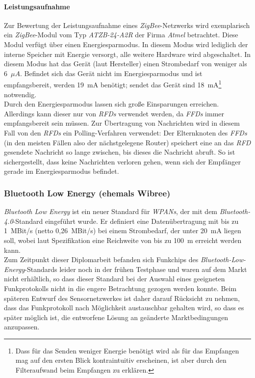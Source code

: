             \paragraph{Leistungsaufnahme}
                Zur Bewertung der Leistungsaufnahme eines \emph{ZigBee}-Netzwerks wird exemplarisch ein 
                \emph{ZigBee}-Modul
                vom Typ \emph{ATZB-24-A2R} der Firma \emph{Atmel} betrachtet. Diese Modul verfügt über einen 
                Energiesparmodus.  In diesem Modus wird lediglich der interne Speicher mit Energie versorgt, alle 
                weitere Hardware wird abgeschaltet. In diesem Modus hat das Gerät (laut Hersteller) einen Strombedarf 
                von weniger als 6~$\mu{}A$. Befindet sich das Gerät nicht im Energiesparmodus und ist empfangsbereit, 
                werden 19~mA benötigt; sendet das Gerät sind 18~mA\footnote{Dass für das Senden weniger
                    Energie benötigt wird als für das Empfangen mag auf den ersten Blick kontraintuitiv 
                    erscheinen, ist aber durch den Filteraufwand beim Empfangen zu erklären.} notwendig.\\
                Durch den Energiesparmodus lassen sich große Einsparungen erreichen. Allerdings kann dieser nur von 
                \emph{RFDs} verwendet werden, da \emph{FFDs} immer empfangsbereit sein müssen. Zur Übertragung von 
                Nachrichten wird in diesem Fall von den \emph{RFDs} ein Polling-Verfahren verwendet: Der Elternknoten des 
                \emph{FFDs} (in den meisten Fällen also der nächstgelegene Router) speichert eine an das \emph{RFD}
                gesendete Nachricht so lange zwischen,
                bis dieses die Nachricht abruft. So ist sichergestellt, dass keine Nachrichten verloren gehen, wenn
                sich der Empfänger gerade im Energiesparmodus befindet.
           

        \subsubsection{Bluetooth Low Energy (ehemals Wibree)}\label{wibree}
            \emph{Bluetooth Low Energy} ist ein neuer Standard für \emph{WPANs}, der mit dem \emph{Bluetooth-4.0}-Standard 
            eingeführt wurde. Er definiert eine Datenübertragung mit bis zu 1~MBit/s (netto 0,26~MBit/s) bei einem 
            Strombedarf, der unter 20~mA liegen soll, wobei laut Spezifikation eine Reichweite von bis zu 100~m erreicht 
            werden kann. \cite{Bluetooth}\\
            Zum Zeitpunkt dieser Diplomarbeit befanden sich Funkchips des \emph{Bluetooth-Low-Energy}-Standards 
            leider noch in der frühen Testphase und waren auf dem Markt nicht erhältlich, so dass dieser Standard 
            bei der Auswahl eines geeigneten Funkprotokolls nicht in die engere Betrachtung gezogen werden konnte.
            Beim späteren Entwurf des Sensornetzwerkes
            ist daher darauf Rücksicht zu nehmen, dass das Funkprotokoll nach Möglichkeit austauschbar gehalten wird,
            so dass es später möglich ist, die entworfene Lösung an geänderte Marktbedingungen anzupassen.
            

